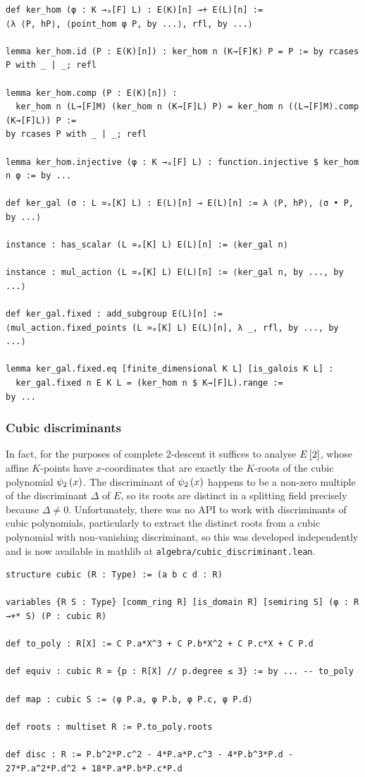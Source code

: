 \begin{lstlisting}[frame=single]
def ker_hom (φ : K →ₐ[F] L) : E(K)[n] →+ E(L)[n] :=
⟨λ ⟨P, hP⟩, ⟨point_hom φ P, by ...⟩, rfl, by ...⟩

lemma ker_hom.id (P : E(K)[n]) : ker_hom n (K→[F]K) P = P := by rcases P with _ | _; refl

lemma ker_hom.comp (P : E(K)[n]) :
  ker_hom n (L→[F]M) (ker_hom n (K→[F]L) P) = ker_hom n ((L→[F]M).comp (K→[F]L)) P :=
by rcases P with _ | _; refl

lemma ker_hom.injective (φ : K →ₐ[F] L) : function.injective $ ker_hom n φ := by ...

def ker_gal (σ : L ≃ₐ[K] L) : E(L)[n] → E(L)[n] := λ ⟨P, hP⟩, ⟨σ • P, by ...⟩

instance : has_scalar (L ≃ₐ[K] L) E(L)[n] := ⟨ker_gal n⟩

instance : mul_action (L ≃ₐ[K] L) E(L)[n] := ⟨ker_gal n, by ..., by ...⟩

def ker_gal.fixed : add_subgroup E(L)[n] :=
⟨mul_action.fixed_points (L ≃ₐ[K] L) E(L)[n], λ _, rfl, by ..., by ...⟩

lemma ker_gal.fixed.eq [finite_dimensional K L] [is_galois K L] :
  ker_gal.fixed n E K L = (ker_hom n $ K→[F]L).range :=
by ...
\end{lstlisting}

\pagebreak

\subsubsection{Cubic discriminants}

In fact, for the purposes of complete $ 2 $-descent it suffices to analyse $ E\sbr{2} $, whose affine $ K $-points have $ x $-coordinates that are exactly the $ K $-roots of the cubic polynomial $ \psi_2\br{x} $. The discriminant of $ \psi_2\br{x} $ happens to be a non-zero multiple of the discriminant $ \Delta $ of $ E $, so its roots are distinct in a splitting field precisely because $ \Delta \ne 0 $. Unfortunately, there was no API to work with discriminants of cubic polynomials, particularly to extract the distinct roots from a cubic polynomial with non-vanishing discriminant, so this was developed independently and is now available in mathlib at \texttt{algebra/cubic\_discriminant.lean}.

\begin{lstlisting}[frame=single]
structure cubic (R : Type) := (a b c d : R)

variables {R S : Type} [comm_ring R] [is_domain R] [semiring S] (φ : R →+* S) (P : cubic R)

def to_poly : R[X] := C P.a*X^3 + C P.b*X^2 + C P.c*X + C P.d

def equiv : cubic R ≃ {p : R[X] // p.degree ≤ 3} := by ... -- to_poly

def map : cubic S := ⟨φ P.a, φ P.b, φ P.c, φ P.d⟩

def roots : multiset R := P.to_poly.roots

def disc : R := P.b^2*P.c^2 - 4*P.a*P.c^3 - 4*P.b^3*P.d - 27*P.a^2*P.d^2 + 18*P.a*P.b*P.c*P.d
\end{lstlisting}

